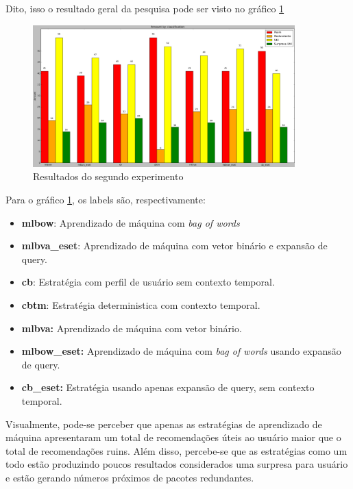 Dito, isso o resultado geral da pesquisa pode ser visto no gráfico
\ref{fig:segundo_experimento}

\begin{figure}[h]
  \centering
  \includegraphics[width=0.9\textwidth]{figuras/segundo_experimento.eps}
  \caption{Resultados do segundo experimento}
  \label{fig:segundo_experimento}
\end{figure}

Para o gráfico \ref{fig:segundo_experimento}, os labels são, respectivamente:

\begin{itemize}
    \item \textbf{mlbow}: Aprendizado de máquina com \textit{bag of words}
    \item \textbf{mlbva\_eset}: Aprendizado de máquina com vetor binário e
    expansão de query.
    \item \textbf{cb}: Estratégia com perfil de usuário sem contexto temporal.
    \item \textbf{cbtm}: Estratégia deterministica com contexto temporal.
    \item \textbf{mlbva:} Aprendizado de máquina com vetor binário.
    \item \textbf{mlbow\_eset:} Aprendizado de máquina com \textit{bag of words}
        usando expansão de query.
    \item \textbf{cb\_eset:} Estratégia usando apenas expansão de query, sem
        contexto temporal.
\end{itemize}

Visualmente, pode-se perceber que apenas as estratégias de aprendizado de
máquina apresentaram um total de recomendações úteis ao usuário maior que o
total de recomendações ruins. Além disso, percebe-se que as estratégias como um
todo estão produzindo poucos resultados considerados uma surpresa para usuário e
estão gerando números próximos de pacotes redundantes.

